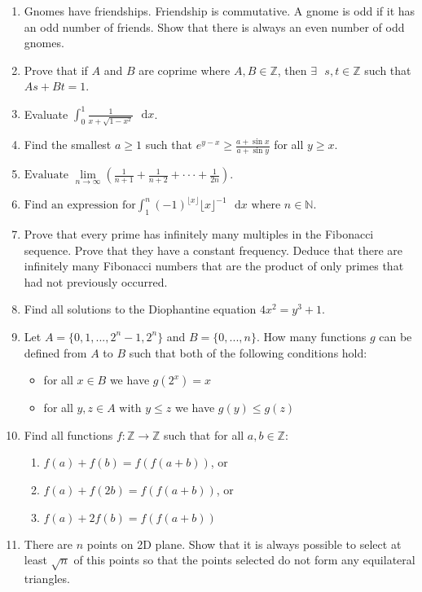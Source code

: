 \documentclass{article}
\begin{document}
\begin{enumerate}
    \item
    Gnomes have friendships. Friendship is commutative. A gnome is odd if it has an odd number of friends. Show that there is always an even number of odd gnomes.
    
    \item
    Prove that if $A$ and $B$ are coprime where $A,B \in \mathbb{Z}$, then $\exists \text{ } s,t \in \mathbb{Z}$ such that $As+Bt=1$.
    
    \item
    Evaluate $\int_{0}^{1} \frac{1}{x+\sqrt{1-x^2}}  \text{ } \mathrm{d}x$.
    
    \item
    Find the smallest $a \geq 1$ such that $e^{y - x} \geq \frac{a + \sin x}{a + \sin y}$ for all $y \geq x$.
    
    \item
    $
        \text{Evaluate } \lim\limits_{n\to\infty} (\frac{1}{n+1} + \frac{1}{n+2} + \cdot \cdot \cdot + \frac{1}{2n})\text{.}
    $
    
    
    \item
    $
        \text{Find an expression for} \int_{1}^{n} (-1)^{\lfloor x \rfloor} \lfloor x \rfloor^{-1} \text{ } \mathrm{d}x \text{ where } n \in \mathbb{N}.
    $
    
    \item
    Prove that every prime has infinitely many multiples in the Fibonacci sequence. Prove that they have a constant frequency. Deduce that there are infinitely many Fibonacci numbers that are the product of only primes that had not previously occurred.
    
    \item
    Find all solutions to the Diophantine equation $4x^2 = y^3 + 1$.
    
    \item 
    Let $A = \{0, 1, ..., 2^n - 1, 2^n\}$ and $B = \{0, ..., n \}$. How many functions $g$ can be defined from $A$ to $B$ such that both of the following conditions hold:
    \begin{itemize}
        \item for all $x \in B$ we have $g(2^x) = x$
        \item for all $y, z \in A$ with $y \leq z$ we have $g(y) \leq g(z)$
    \end{itemize}
    
    
    \item
    Find all functions $f: \mathbb{Z} \to \mathbb{Z}$ such that for all $a,b \in \mathbb{Z}$:
    \begin{enumerate}
        \item $f(a)+f(b) = f(f(a+b))$, or
        \item $f(a)+f(2b) = f(f(a+b))$, or
        \item $f(a)+2f(b) = f(f(a+b))$
    \end{enumerate}
    
    \item
    There are $n$ points on 2D plane. Show that it is always possible to select at least $\sqrt{n}$ of this points so that the points selected do not form any equilateral triangles.
\end{enumerate}
\end{document}
